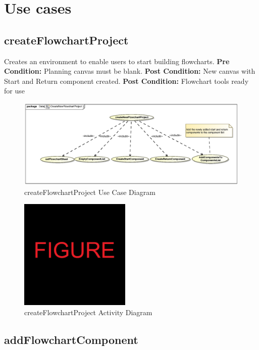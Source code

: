 \documentclass[11pt,a4paper,titlepage]{article}
\begin{document}
\newpage
\section{Use cases}

\subsection{createFlowchartProject}
Creates an environment to enable users to start building flowcharts.\newline\newline
\textbf{Pre Condition:} Planning canvas must be blank.\newline\newline
\textbf{Post Condition:} New canvas with Start and Return component created.\newline
\textbf{Post Condition:} Flowchart tools ready for use\newline

\begin{figure}[H]
  \centering
\includegraphics[width=500px]{createNewFlowchartProject.eps}
\caption{createFlowchartProject Use Case Diagram}
\end{figure}

\begin{figure}[H]
  \centering
\includegraphics[width=200px]{figure.jpg}
\caption{createFlowchartProject Activity Diagram}
\end{figure}

\newpage
\subsection{addFlowchartComponent}
\end{document}
